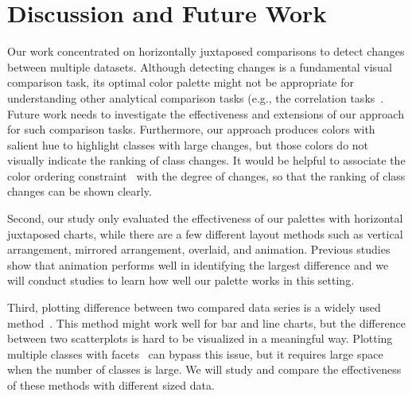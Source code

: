 \section {Discussion and Future Work}


Our work concentrated on horizontally juxtaposed comparisons to detect changes between multiple datasets.
Although detecting changes is a fundamental visual comparison task, its optimal color palette might not be appropriate for understanding other analytical comparison tasks (e.g., the correlation tasks~\cite{Ondov19}. Future work needs to investigate the effectiveness and extensions of our approach for such comparison tasks. Furthermore, our approach produces colors with salient hue to highlight classes with large changes, but those colors do not visually indicate the ranking of class changes.
It would be helpful to associate the color ordering constraint~\cite{Bujack18} with the degree of changes, so that the ranking of class changes can be shown clearly.

Second, our study only evaluated the effectiveness of our palettes with horizontal juxtaposed charts, while there are a few different layout methods such as vertical arrangement, mirrored
arrangement, overlaid, and animation. Previous studies~\cite{Ondov19} show that animation performs well in identifying the largest difference and we will conduct studies to learn how well our palette works in this setting. 

Third, plotting difference between two compared data series is a widely used method~\cite{Gleicher11}. This method might work well for bar and line charts, but the difference between two scatterplots is hard to be visualized in a meaningful way. Plotting multiple classes with facets~\cite{wickham2009elegant} can bypass this issue, but it requires large space when the number of classes is large. We will study and compare the effectiveness of these methods with different sized data.


